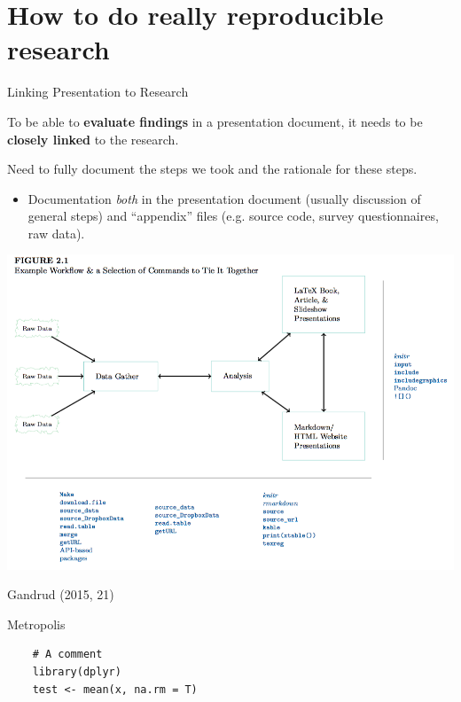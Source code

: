\documentclass[10pt]{beamer}
\begin{document}
\section{How to do really reproducible research}


\begin{frame}{Linking Presentation to Research}

    To be able to {\large{\textbf{evaluate findings}}} in a presentation document, it needs to be {\large{\textbf{closely linked}}} to the research.

    \vspace{1cm}

    Need to \alert{fully document} the steps we took and the rationale for these steps.

    \begin{itemize}
        \item Documentation \emph{both} in the presentation document (usually discussion of general steps) and ``appendix'' files (e.g. source code, survey questionnaires, raw data).
    \end{itemize}

\end{frame}

\begin{frame}

    \includegraphics[scale=0.3]{img/workflow.png}

{\tiny{Gandrud (2015, 21)}}
\end{frame}



\begin{frame}[fragile]{Metropolis}


    \begin{lstlisting}
    # A comment
    library(dplyr)
    test <- mean(x, na.rm = T)
    \end{lstlisting}


\end{frame}
\end{document}
